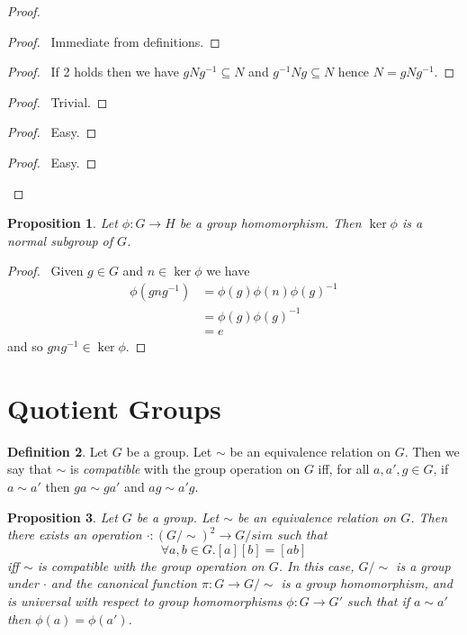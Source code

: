 \documentclass{book}
\let\qed\relax
\newtheorem{prop}{Proposition}[chapter]
\theoremstyle{definition}
\newtheorem{df}[prop]{Definition}
\newcommand{\inv}[1]{\ensuremath{{#1}^{-1}}}
\begin{document}
\begin{proof}
\pf
{}
\begin{proof}
\pf\ Immediate from definitions.
\end{proof}
\begin{proof}
	\pf\ If 2 holds then we have $gN\inv{g} \subseteq N$ and $\inv{g}Ng \subseteq N$ hence $N = gN\inv{g}$.
\end{proof}
\begin{proof}
\pf\ Trivial.
\end{proof}
\begin{proof}
\pf\ Easy.
\end{proof}
\begin{proof}
\pf\ Easy.
\end{proof}
\qed
\end{proof}

\begin{prop}
\label{prop:kernel-normal}
Let $\phi : G \rightarrow H$ be a group homomorphism. Then $\ker \phi$ is a normal subgroup of $G$.
\end{prop}

\begin{proof}
\pf\ Given $g \in G$ and $n \in \ker \phi$ we have
\begin{align*}
\phi(gn\inv{g}) & = \phi(g) \phi(n) \inv{\phi(g)} \\
& = \phi(g) \inv{\phi(g)} \\
& = e
\end{align*}
and so $gn\inv{g} \in \ker \phi$. \qed
\end{proof}

\section{Quotient Groups}

\begin{df}
Let $G$ be a group. Let $\sim$ be an equivalence relation on $G$. Then we say that $\sim$ is \emph{compatible} with the group operation on $G$ iff, for all $a, a', g \in G$, if $a \sim a'$ then $ga \sim ga'$ and $ag \sim a'g$.
\end{df}

\begin{prop}
Let $G$ be a group. Let $\sim$ be an equivalence relation on $G$. Then there exists an operation $\cdot : (G/\sim)^2 \rightarrow G/sim$ such that
\[ \forall a,b \in G. [a][b] = [ab] \]
iff $\sim$ is compatible with the group operation on $G$. In this case, $G/\sim$ is a group under $\cdot$ and the canonical function $\pi : G \rightarrow G / \sim$ is a group homomorphism, and is universal with respect to group homomorphisms $\phi : G \rightarrow G'$ such that if $a \sim a'$ then $\phi(a) = \phi(a')$.
\end{prop}
\end{document}
